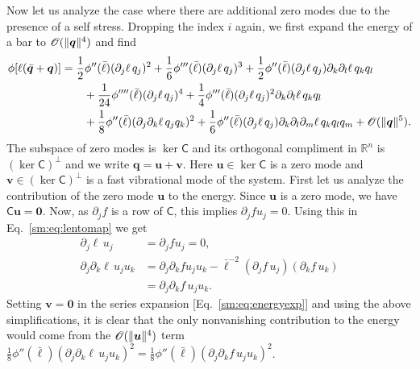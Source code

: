 Now let us analyze the case where there are additional zero modes due to the presence of a self stress.
Dropping the index $i$ again, we first expand the energy of a bar to $\mathscr{O}(\lVert\bm{q}\rVert^4)$ and find
%
\begin{equation}
  \begin{aligned}
    \phi[\ell(\bar{\bm{q}} + \bm{q})] &=
    \frac{1}{2}\phi''(\bar{\ell})(\partial_j \ell\,q_j)^2 +
    \frac{1}{6}\phi'''(\bar{\ell})(\partial_j \ell\,q_j)^3 +
    \frac{1}{2}\phi''(\bar{\ell})(\partial_j \ell\,q_j)\partial_k\partial_l \ell\, q_k q_l\\ &\qquad+
    \frac{1}{24}\phi''''(\bar{\ell})(\partial_j \ell\,q_j)^4 +
    \frac{1}{4}\phi'''(\bar{\ell})(\partial_j \ell\,q_j)^2 \partial_k \partial_l \ell\, q_k q_l\\ &\qquad+
    \frac{1}{8}\phi''(\bar{\ell})(\partial_j\partial_k \ell\, q_j q_k)^2 +
    \frac{1}{6}\phi''(\bar{\ell})(\partial_j \ell\, q_j)\partial_k\partial_l\partial_m \ell\, q_k q_l q_m + \mathscr{O}(\lVert\bm{q}\rVert^5).
  \end{aligned}
  \label{sm:eq:energyexp}
\end{equation}
%
The subspace of zero modes is $\ker\mathsf{C}$ and its orthogonal compliment in $\mathbb{R}^n$ is $(\ker\mathsf{C})^\perp$ and we write $\bm{q} = \bm{u} + \bm{v}$.
Here $\bm{u} \in \ker\mathsf{C}$ is a zero mode and $\bm{v} \in (\ker\mathsf{C})^{\perp}$ is a fast vibrational mode of the system.
First let us analyze the contribution of the zero mode $\bm{u}$ to the energy.
Since $\bm{u}$ is a zero mode, we have $\mathsf{C}\bm{u} = \bm{0}$.
Now, as $\partial_j f$ is a row of $\mathsf{C}$, this implies $\partial_j f u_j = 0$.
Using this in Eq.~\eqref{sm:eq:lentomap} we get
%
\begin{equation}
  \begin{aligned}
    \partial_j \ell\,u_j &= \partial_j f u_j=0,\\
    \partial_j \partial_k \ell\, u_j u_k
                        &= \partial_j\partial_k f u_j u_k - \bar{\ell}^{-2}(\partial_j f\, u_j) (\partial_k f\, u_k)\\
                        &= \partial_j\partial_k f\, u_j u_k.
  \end{aligned}
\end{equation}
%
Setting $\bm{v} = \bm{0}$ in the series expansion [Eq.~\eqref{sm:eq:energyexp}] and using the above simplifications, it is clear that the only nonvanishing contribution to the energy would come from the $\mathscr{O}(\lVert\bm{u}\rVert^4)$ term $\frac{1}{8}{\phi''(\bar{\ell})}(\partial_j \partial_k \ell\, u_j u_k)^2 = \frac{1}{8}{\phi''(\bar{\ell})}(\partial_j \partial_k f\, u_j u_k)^2$.

